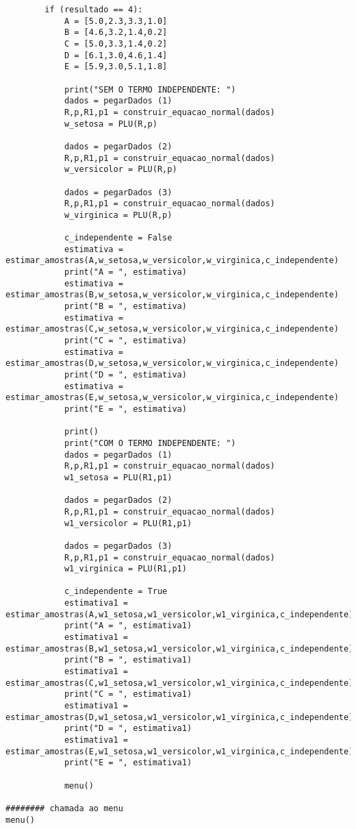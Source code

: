 \documentclass[a4paper,12pt,twoside]{article}
\begin{document}
\begin{lstlisting}
        if (resultado == 4):
            A = [5.0,2.3,3.3,1.0]
            B = [4.6,3.2,1.4,0.2]
            C = [5.0,3.3,1.4,0.2]
            D = [6.1,3.0,4.6,1.4]
            E = [5.9,3.0,5.1,1.8]
            
            print("SEM O TERMO INDEPENDENTE: ")
            dados = pegarDados (1)
            R,p,R1,p1 = construir_equacao_normal(dados)
            w_setosa = PLU(R,p)
            
            dados = pegarDados (2)
            R,p,R1,p1 = construir_equacao_normal(dados)
            w_versicolor = PLU(R,p)
        
            dados = pegarDados (3)
            R,p,R1,p1 = construir_equacao_normal(dados)
            w_virginica = PLU(R,p)
            
            c_independente = False
            estimativa = estimar_amostras(A,w_setosa,w_versicolor,w_virginica,c_independente)
            print("A = ", estimativa)
            estimativa = estimar_amostras(B,w_setosa,w_versicolor,w_virginica,c_independente)
            print("B = ", estimativa)
            estimativa = estimar_amostras(C,w_setosa,w_versicolor,w_virginica,c_independente)
            print("C = ", estimativa)
            estimativa = estimar_amostras(D,w_setosa,w_versicolor,w_virginica,c_independente)
            print("D = ", estimativa)
            estimativa = estimar_amostras(E,w_setosa,w_versicolor,w_virginica,c_independente)
            print("E = ", estimativa)
            
            print()
            print("COM O TERMO INDEPENDENTE: ")
            dados = pegarDados (1)
            R,p,R1,p1 = construir_equacao_normal(dados)
            w1_setosa = PLU(R1,p1)
            
            dados = pegarDados (2)
            R,p,R1,p1 = construir_equacao_normal(dados)
            w1_versicolor = PLU(R1,p1)
            
            dados = pegarDados (3)
            R,p,R1,p1 = construir_equacao_normal(dados)
            w1_virginica = PLU(R1,p1)
            
            c_independente = True
            estimativa1 = estimar_amostras(A,w1_setosa,w1_versicolor,w1_virginica,c_independente)
            print("A = ", estimativa1)
            estimativa1 = estimar_amostras(B,w1_setosa,w1_versicolor,w1_virginica,c_independente)
            print("B = ", estimativa1)
            estimativa1 = estimar_amostras(C,w1_setosa,w1_versicolor,w1_virginica,c_independente)
            print("C = ", estimativa1)
            estimativa1 = estimar_amostras(D,w1_setosa,w1_versicolor,w1_virginica,c_independente)
            print("D = ", estimativa1)
            estimativa1 = estimar_amostras(E,w1_setosa,w1_versicolor,w1_virginica,c_independente)
            print("E = ", estimativa1)
            
            menu()
                       
######## chamada ao menu
menu()
\end{lstlisting}
\end{document}
